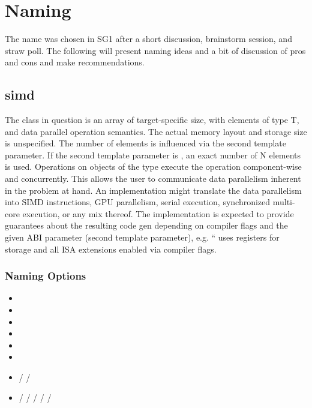 \section{Naming}\label{sec:Naming}

The name \simd was chosen in SG1 after a short discussion, brainstorm session, and straw poll.
The following will present naming ideas and a bit of discussion of pros and cons and make
recommendations.

\subsection{simd}

The class in question is an array of target-specific size, with elements of type T, and data parallel operation semantics.
The actual memory layout and storage size is unspecified.
The number of elements is influenced via the second template parameter.
If the second template parameter is , an exact number of N elements is used.
Operations on objects of the type execute the operation component-wise and concurrently.
This allows the user to communicate data parallelism inherent in the problem at hand.
An implementation might translate the data parallelism into SIMD instructions, GPU parallelism, serial execution, synchronized multi-core execution, or any mix thereof.
The implementation is expected to provide guarantees about the resulting code gen depending on compiler flags and the given ABI parameter (second template parameter), e.g. “ uses  registers for storage and all ISA extensions enabled via compiler flags.

\subsubsection{Naming Options}

\begin{itemize}
  \item {}
  \item {}
  \item {}
  \item {}
  \item {}
  \item {}
  \item {} /  / 
  \item {} /  /  /  /  / 
\end{itemize}

